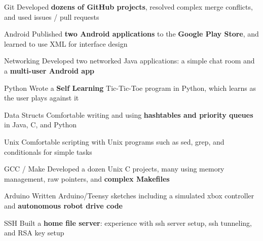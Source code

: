 




\begin{cvskills}

 \cvskill
    {Git} %
    {Developed \textbf{dozens of GitHub projects}, resolved complex merge conflicts, and used issues / pull requests} %

 \cvskill
    {Android} %
    {Published \textbf{two Android applications} to the \textbf{Google Play Store}, and learned to use XML for interface design} %

 \cvskill
    {Networking} %
    {Developed two networked Java applications: a simple chat room and a \textbf{multi-user Android app}} %
 
 \cvskill
    {Python} %
    {Wrote a \textbf{Self Learning} Tic-Tic-Toe program in Python, which learns as the user plays against it} %

 \cvskill
    {Data Structs} %
    {Comfortable writing and using \textbf{hashtables and priority queues} in Java, C, and Python} %

 \cvskill
    {Unix} %
    {Comfortable scripting with Unix programs such as sed, grep, and conditionals for simple tasks} %

 \cvskill
    {GCC / Make} %
    {Developed a dozen Unix C projects, many using memory management, raw pointers, and \textbf{complex Makefiles}} %

 \cvskill
    {Arduino} %
    {Written Arduino/Teensy sketches including a simulated xbox controller and \textbf{autonomous robot drive code}} %

 \cvskill
    {SSH} %
    {Built a \textbf{home file server}: experience with ssh server setup, ssh tunneling, and RSA key setup} %


\end{cvskills}

